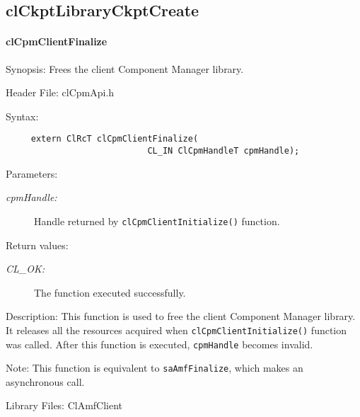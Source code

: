 {\newpage


\subsection{clCkptLibraryCkptCreate}
\hypertarget{pagecpm109}{}\paragraph{cl\-Cpm\-Client\-Finalize}\label{pagecpm109}
\begin{Desc}
\item[Synopsis:]Frees the client Component Manager library.\end{Desc}
\begin{Desc}
\item[Header File:]clCpmApi.h\end{Desc}
\begin{Desc}
\item[Syntax:]

\footnotesize\begin{verbatim}     extern ClRcT clCpmClientFinalize(
                			CL_IN ClCpmHandleT cpmHandle);
\end{verbatim}
\normalsize
\end{Desc}
\begin{Desc}
\item[Parameters:]
\begin{description}
\item[{\em cpm\-Handle:}]Handle returned by {\tt{cl\-Cpm\-Client\-Initialize()}} function.\end{description}
\end{Desc}
\begin{Desc}
\item[Return values:]
\begin{description}
\item[{\em CL\_\-OK:}]The function executed successfully.\end{description}
\end{Desc}
\begin{Desc}
\item[Description:]This function is used to free the client Component Manager library. It releases all the resources acquired when
{\tt{cl\-Cpm\-Client\-Initialize()}} function was called. After this function is executed, {\tt{cpm\-Handle}} becomes 
invalid.
\end{Desc}
\begin{Desc}
\item[Note:]This function is equivalent to {\tt{sa\-Amf\-Finalize}}, which makes an asynchronous call.\end{Desc}
\begin{Desc}
\item[Library Files:]Cl\-Amf\-Client\end{Desc}

}
